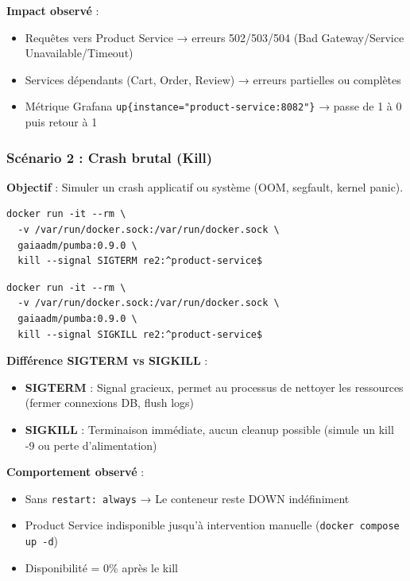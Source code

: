 \textbf{Impact observé} :
\begin{itemize}
    \item Requêtes vers Product Service → erreurs 502/503/504 (Bad Gateway/Service Unavailable/Timeout)
    \item Services dépendants (Cart, Order, Review) → erreurs partielles ou complètes
    \item Métrique Grafana \texttt{up\{instance="product-service:8082"\}} → passe de 1 à 0 puis retour à 1
\end{itemize}

\subsubsection{Scénario 2 : Crash brutal (Kill)}

\textbf{Objectif} : Simuler un crash applicatif ou système (OOM, segfault, kernel panic).

\begin{lstlisting}[caption={Commande Pumba - Kill SIGTERM}]
docker run -it --rm \
  -v /var/run/docker.sock:/var/run/docker.sock \
  gaiaadm/pumba:0.9.0 \
  kill --signal SIGTERM re2:^product-service$
\end{lstlisting}

\begin{lstlisting}[caption={Commande Pumba - Kill SIGKILL (brutal)}]
docker run -it --rm \
  -v /var/run/docker.sock:/var/run/docker.sock \
  gaiaadm/pumba:0.9.0 \
  kill --signal SIGKILL re2:^product-service$
\end{lstlisting}

\textbf{Différence SIGTERM vs SIGKILL} :
\begin{itemize}
    \item \textbf{SIGTERM} : Signal gracieux, permet au processus de nettoyer les ressources (fermer connexions DB, flush logs)
    \item \textbf{SIGKILL} : Terminaison immédiate, aucun cleanup possible (simule un kill -9 ou perte d'alimentation)
\end{itemize}

\textbf{Comportement observé} :
\begin{itemize}
    \item Sans \texttt{restart: always} → Le conteneur reste DOWN indéfiniment
    \item Product Service indisponible jusqu'à intervention manuelle (\texttt{docker compose up -d})
    \item Disponibilité = 0\% après le kill
\end{itemize}

